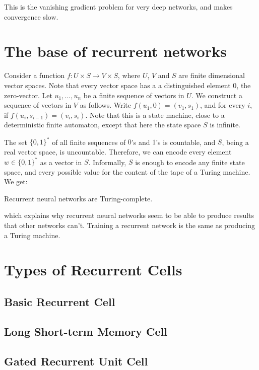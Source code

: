 \documentclass[10pt]{amsart}
\begin{document}
This is the vanishing gradient problem for very deep networks, and makes convergence slow.

\section{The base of recurrent networks}

Consider a function $f:U\times S\to V\times S$, where $U$, $V$ and $S$ are finite dimensional vector spaces.
Note that every vector space has a a distinguished element $0$, the zero-vector.  Let $u_1,...,u_n$ be a finite
sequence of vectors in $U$.  We construct a sequence of vectors in $V$ as follows. Write $f(u_1, 0)=(v_1, s_1)$,
and for every $i$, if $f(u_{i}, s_{i-1})=(v_i, s_i)$. Note that this is a state machine, close to a
deterministic finite automaton, except that here the state space $S$ is infinite.

The set $\{0,1\}^*$ of all finite sequences of $0$'s and $1$'s is countable, and $S$, being a real vector space,
is uncountable.  Therefore, we can encode every element $w\in\{0,1\}^*$ as a vector in $S$.  Informally,
$S$ is enough to encode any finite state space, and every possible value for the content of the tape of a
Turing machine. We get:

Recurrent neural networks are Turing-complete.

which explains why recurrent neural networks seem to be able to produce results that other networks can't.
Training a recurrent network is the same as producing a Turing machine.



\section{Types of Recurrent Cells}

\subsection{Basic Recurrent Cell}

\subsection{Long Short-term Memory Cell}

\subsection{Gated Recurrent Unit Cell}
\end{document}
